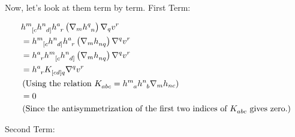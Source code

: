 Now, let's look at them term by term. 
\newline First Term:

\begin{align*}
  & \tt{h}{m}{[c} \tt{h}{n}{d]} \tt{h}{a}{r} \lera{ \nabla_m \tt{h}{q}{n} } \nabla_q v^r \\
  &= \tt{h}{m}{[c} \tt{h}{n}{d]} \tt{h}{a}{r} \lera{ \nabla_m \tt{h}{}{nq} } \nabla^q v^r \\
  &= \tt{h}{a}{r} \tt{h}{m}{[c} \tt{h}{n}{d]}  \lera{ \nabla_m \tt{h}{}{nq} } \nabla^q v^r \\
  &= \tt{h}{a}{r} \tt{K}{}{[cd]q} \nabla^q v^r \\
  & \lera{ \text{Using the relation $ \tt{K}{}{abc}=  \tt{h}{m}{a } \tt{h}{n}{b} \nabla_m h_{nc}$}}\\
  &= 0 \\
  & \lera{ \text{Since the antisymmetrization of the first two indices of $ \tt{K}{}{abc}$ gives zero.}}
\end{align*}

 Second Term:

